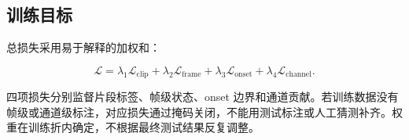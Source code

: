 \documentclass{cumcmthesis_v3}
\numberwithin{figure}{section}
\numberwithin{table}{section}
\begin{document}
\subsection{训练目标}

总损失采用易于解释的加权和：

\[
\mathcal{L}=\lambda_1\mathcal{L}_{\mathrm{clip}}
+\lambda_2\mathcal{L}_{\mathrm{frame}}
+\lambda_3\mathcal{L}_{\mathrm{onset}}
+\lambda_4\mathcal{L}_{\mathrm{channel}}.
\]

四项损失分别监督片段标签、帧级状态、onset 边界和通道贡献。若训练数据没有帧级或通道级标注，对应损失通过掩码关闭，不能用测试标注或人工猜测补齐。权重在训练折内确定，不根据最终测试结果反复调整。


\end{document}
